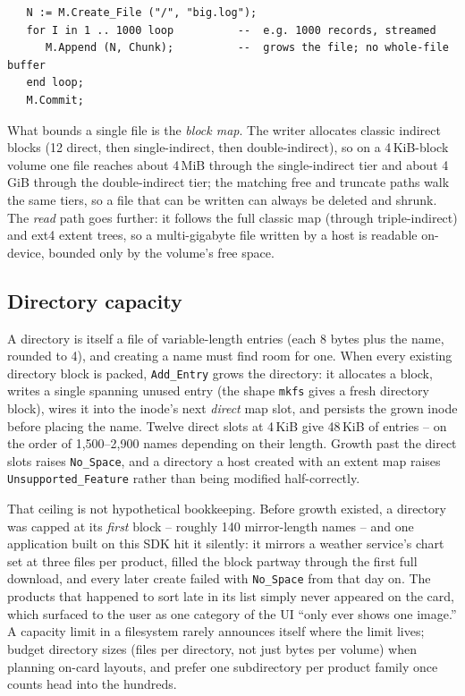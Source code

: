 \begin{lstlisting}
   N := M.Create_File ("/", "big.log");
   for I in 1 .. 1000 loop          --  e.g. 1000 records, streamed
      M.Append (N, Chunk);          --  grows the file; no whole-file buffer
   end loop;
   M.Commit;
\end{lstlisting}

What bounds a single file is the \emph{block map}. The writer allocates classic
indirect blocks (12 direct, then single-indirect, then double-indirect), so
on a 4\,KiB-block volume one file reaches about 4\,MiB through the single-indirect
tier and about 4\,GiB through the double-indirect tier; the matching free and
truncate paths walk the same tiers, so a file that can be written can always be
deleted and shrunk. The \emph{read} path goes further: it follows the full
classic map (through triple-indirect) and ext4 extent trees, so a
multi-gigabyte file written by a host is readable on-device, bounded only by the
volume's free space.

\subsection{Directory capacity}

A directory is itself a file of variable-length entries (each 8 bytes plus the
name, rounded to 4), and creating a name must find room for one. When every
existing directory block is packed, \texttt{Add\_Entry} grows the directory:
it allocates a block, writes a single spanning unused entry (the shape
\texttt{mkfs} gives a fresh directory block), wires it into the inode's next
\emph{direct} map slot, and persists the grown inode before placing the name.
Twelve direct slots at 4\,KiB give 48\,KiB of entries -- on the order of
1{,}500--2{,}900 names depending on their length. Growth past the direct slots
raises \texttt{No\_Space}, and a directory a host created with an extent map
raises \texttt{Unsupported\_Feature} rather than being modified half-correctly.

That ceiling is not hypothetical bookkeeping. Before growth existed, a
directory was capped at its \emph{first} block -- roughly 140 mirror-length
names -- and one application built on this SDK hit it silently: it mirrors a
weather service's chart set at three files per product, filled the block
partway through the first full download, and every later create failed with
\texttt{No\_Space} from that day on. The products that happened to sort late in
its list simply never appeared on the card, which surfaced to the user as one
category of the UI ``only ever shows one image.'' A capacity limit in a
filesystem rarely announces itself where the limit lives; budget directory
sizes (files per directory, not just bytes per volume) when planning on-card
layouts, and prefer one subdirectory per product family once counts head into
the hundreds.

